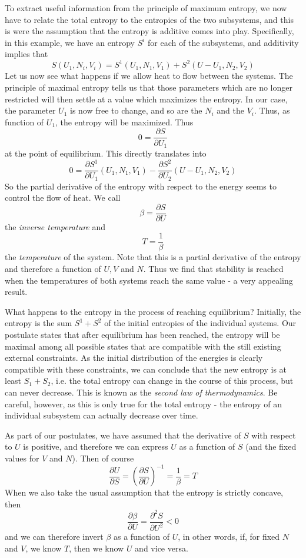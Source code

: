 \documentclass[a4paper, draft]{article}
\theoremstyle{own}
\theoremstyle{remark}
\begin{document}
 
To extract useful information from the principle of maximum entropy, we now have to relate the total entropy to the entropies of the two subsystems, and this is were the assumption that the entropy is additive comes into play. Specifically, in this example,
we have an entropy $S^i$ for each of the subsystems, and additivity implies that
$$
S(U_1, N_i, V_i) = S^1(U_1, N_1, V_1) + S^2(U - U_1, N_2, V_2)
$$
Let us now see what happens if we allow heat to flow between the systems. The principle of maximal entropy tells us that those parameters which are no longer restricted will then settle at a value which maximizes the entropy. In our case, the parameter $U_1$ is now free to change, and so are the $N_i$ and the $V_i$. Thus, as function of $U_1$, the entropy will be maximized. Thus
$$
0 = \frac{\partial S}{\partial U_1}
$$
at the point of equilibrium. This directly translates into 
$$
0 = \frac{\partial S^1}{\partial U_1}(U_1, N_1, V_1) - \frac{\partial S^2}{\partial U_2}(U - U_1, N_2, V_2)
$$
So the partial derivative of the entropy with respect to the energy seems to control the flow of heat. We call
$$
\beta = \frac{\partial S}{\partial U}
$$
the {\em inverse temperature} and 
$$
T = \frac{1}{\beta}
$$
the {\em temperature} of the system. Note that this is a partial derivative of the entropy and therefore a function of $U, V$ and $N$. Thus we find that stability is reached when the temperatures of both systems reach the same value - a very appealing result. 

What happens to the entropy in the process of reaching equilibrium? Initially, the entropy is the sum $S^1 + S^2$ of the initial entropies of the individual systems. Our postulate states that after equilibrium has been reached, the entropy will be maximal among all possible states that are compatible with the still existing external constraints. As the initial distribution of the energies is clearly compatible with these constraints, we can conclude that the new entropy is at least $S_1 + S_2$, i.e. the total entropy can change in the course of this process, but can never decrease. This is known as the {\em second law of thermodynamics}. Be careful, however, as this is only true for the total entropy - the entropy of an individual subsystem can actually decrease over time.

As part of our postulates, we have assumed that the derivative of $S$ with respect to $U$ is positive, and therefore we can express $U$ as a function of $S$ (and the fixed values for $V$ and $N$). Then of course 
$$
\frac{\partial U}{\partial S} =  (\frac{\partial S}{\partial U})^{-1} = \frac{1}{\beta} = T
$$
When we also take the usual assumption that the entropy is strictly concave, then
$$
\frac{\partial \beta}{\partial U} = \frac{\partial^2 S}{\partial U^2} < 0
$$
and we can therefore invert $\beta$ as a function of $U$, in other words, if, for fixed $N$ and $V$, we know $T$, then we know $U$ and vice versa.
\end{document}
